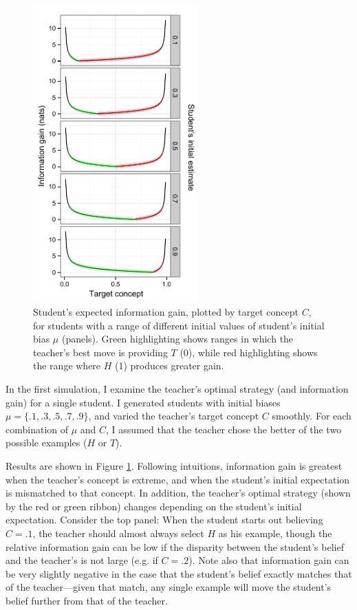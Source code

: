 \documentclass[10pt,letterpaper]{article}
\begin{document}
\begin{figure}[t]
\begin{center}
\includegraphics[width=2.5in]{figures/single_student_gain.pdf}
\end{center}
\caption{\label{fig:student} Student's expected information gain, plotted by target concept $C$, for students with a range of different initial values of student's initial bias $\mu$ (panels). Green highlighting shows ranges in which the teacher's best move is providing $T$ (0), while red highlighting shows the range where $H$ (1) produces greater gain.}
\end{figure}

In the first simulation, I examine the teacher's optimal strategy (and information gain) for a single student. I generated students with initial biases $\mu= \{.1, .3, .5, .7, .9\}$, and varied the teacher's target concept $C$ smoothly. For each combination of $\mu$ and $C$, I assumed that the teacher chose the better of the two possible examples ($H$ or $T$). 

Results are shown in Figure \ref{fig:student}. Following intuitions, information gain is greatest when the teacher's concept is extreme, and when the student's initial expectation is mismatched to that concept. In addition, the teacher's optimal strategy (shown by the red or green ribbon) changes depending on the student's initial expectation. Consider the top panel: When the student starts out believing $C=.1$, the teacher should almost always select $H$ as his example, though the relative information gain can be low if the disparity between the student's belief and the teacher's is not large (e.g. if $C=.2$). Note also that information gain can be very slightly negative in the case that the student's belief exactly matches that of the teacher---given that match, any single example will move the student's belief further from that of the teacher. 
\end{document}
